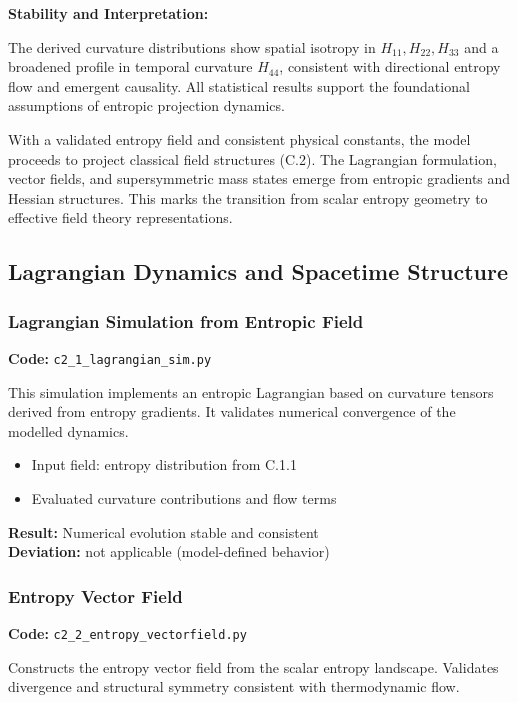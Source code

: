 \documentclass[10.5pt,a4paper]{article}
\begin{document}
\noindent\textbf{Stability and Interpretation:}

The derived curvature distributions show spatial isotropy in \( H_{11}, H_{22}, H_{33} \) and a broadened profile in temporal curvature \( H_{44} \), consistent with directional entropy flow and emergent causality. All statistical results support the foundational assumptions of entropic projection dynamics.

With a validated entropy field and consistent physical constants, the model proceeds to project classical field structures (C.2). The Lagrangian formulation, vector fields, and supersymmetric mass states emerge from entropic gradients and Hessian structures. This marks the transition from scalar entropy geometry to effective field theory representations.

\subsection{Lagrangian Dynamics and Spacetime Structure}

\subsubsection{Lagrangian Simulation from Entropic Field}

\noindent\textbf{Code:} \texttt{c2\_1\_lagrangian\_sim.py}

This simulation implements an entropic Lagrangian based on curvature tensors derived from entropy gradients. It validates numerical convergence of the modelled dynamics.

\begin{itemize}
    \item Input field: entropy distribution from C.1.1
    \item Evaluated curvature contributions and flow terms
\end{itemize}

\noindent\textbf{Result:} Numerical evolution stable and consistent\\
\textbf{Deviation:} not applicable (model-defined behavior)

\subsubsection{Entropy Vector Field}

\noindent\textbf{Code:} \texttt{c2\_2\_entropy\_vectorfield.py}

Constructs the entropy vector field from the scalar entropy landscape. Validates divergence and structural symmetry consistent with thermodynamic flow.
\end{document}
